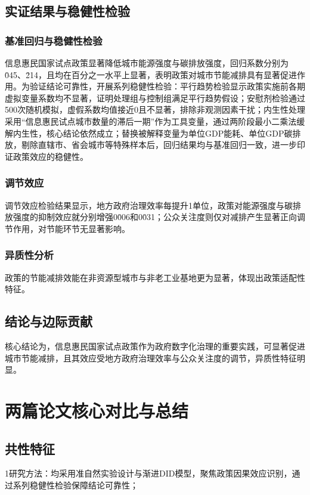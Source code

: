 \documentclass[lang=cn,a4paper,11pt]{elegantpaper}
\begin{document}
\subsection{实证结果与稳健性检验}
\subsubsection{基准回归与稳健性检验}

信息惠民国家试点政策显著降低城市能源强度与碳排放强度，回归系数分别为\.045、\.214，且均在百分之一水平上显著，表明政策对城市节能减排具有显著促进作用。为验证结论可靠性，开展系列稳健性检验：平行趋势检验显示政策实施前各期虚拟变量系数均不显著，证明处理组与控制组满足平行趋势假设；安慰剂检验通过500次随机模拟，虚假系数均值接近0且不显著，排除非观测因素干扰；内生性处理采用“信息惠民试点城市数量的滞后一期”作为工具变量，通过两阶段最小二乘法缓解内生性，核心结论依然成立；替换被解释变量为单位GDP能耗、单位GDP碳排放，剔除直辖市、省会城市等特殊样本后，回归结果均与基准回归一致，进一步印证政策效应的稳健性。

\subsubsection{调节效应}
调节效应检验结果显示，地方政府治理效率每提升1单位，政策对能源强度与碳排放强度的抑制效应就分别增强0\.006和0\.031；公众关注度则仅对减排产生显著正向调节作用，对节能环节无显著影响。


\subsubsection{异质性分析}
政策的节能减排效能在非资源型城市与非老工业基地更为显著，体现出政策适配性特征。
\subsection{结论与边际贡献}
核心结论为，信息惠民国家试点政策作为政府数字化治理的重要实践，可显著促进城市节能减排，且其效应受地方政府治理效率与公众关注度的调节，异质性特征明显。


\section{两篇论文核心对比与总结}
\subsection{共性特征}
1\. 研究方法：均采用准自然实验设计与渐进DID模型，聚焦政策因果效应识别，通过系列稳健性检验保障结论可靠性；
\end{document}
